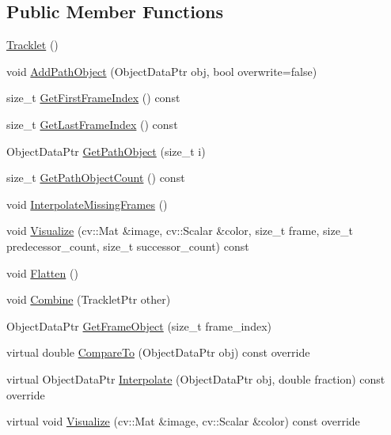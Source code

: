\subsection*{Public Member Functions}
\begin{DoxyCompactItemize}
\item 
\hyperlink{classcore_1_1Tracklet_aedf59b5a9a068a28bb7570f2a031d4e7}{Tracklet} ()
\item 
void \hyperlink{classcore_1_1Tracklet_ab0b397f2d0685a927de886dbd36c3bc8}{Add\+Path\+Object} (Object\+Data\+Ptr obj, bool overwrite=false)
\item 
size\+\_\+t \hyperlink{classcore_1_1Tracklet_a1b963319d6c65614baec02a925f31691}{Get\+First\+Frame\+Index} () const
\item 
size\+\_\+t \hyperlink{classcore_1_1Tracklet_ad8e195b523cf2021394455cc21867d96}{Get\+Last\+Frame\+Index} () const
\item 
Object\+Data\+Ptr \hyperlink{classcore_1_1Tracklet_a9758349e8f25c479ffc4b21a90149a81}{Get\+Path\+Object} (size\+\_\+t i)
\item 
size\+\_\+t \hyperlink{classcore_1_1Tracklet_aee4298a7b734b2b7533d4536006a8aa8}{Get\+Path\+Object\+Count} () const
\item 
void \hyperlink{classcore_1_1Tracklet_a10b56b608b24ef547550540e5a755bce}{Interpolate\+Missing\+Frames} ()
\item 
void \hyperlink{classcore_1_1Tracklet_a3a2b241939559e47aef701d2e2c4d4bd}{Visualize} (cv\+::\+Mat \&image, cv\+::\+Scalar \&color, size\+\_\+t frame, size\+\_\+t predecessor\+\_\+count, size\+\_\+t successor\+\_\+count) const
\item 
void \hyperlink{classcore_1_1Tracklet_a2bdb2f2c8249145808e7029dde6e7df0}{Flatten} ()
\item 
void \hyperlink{classcore_1_1Tracklet_a5bbbf1e2858edaad93c04cc663afeeff}{Combine} (Tracklet\+Ptr other)
\item 
Object\+Data\+Ptr \hyperlink{classcore_1_1Tracklet_a5a0e56045f8c1868b46db87700658260}{Get\+Frame\+Object} (size\+\_\+t frame\+\_\+index)
\item 
virtual double \hyperlink{classcore_1_1Tracklet_a0357f2fa173941800571432dcbc96dc2}{Compare\+To} (Object\+Data\+Ptr obj) const override
\item 
virtual Object\+Data\+Ptr \hyperlink{classcore_1_1Tracklet_a5fb5e6ab9df668c3477e8b52f115b188}{Interpolate} (Object\+Data\+Ptr obj, double fraction) const override
\item 
virtual void \hyperlink{classcore_1_1Tracklet_a85f92a4059bf89f24a83f28935675181}{Visualize} (cv\+::\+Mat \&image, cv\+::\+Scalar \&color) const override
\end{DoxyCompactItemize}


